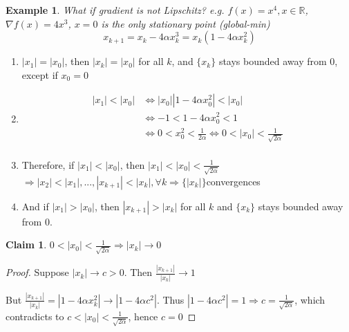 \documentclass[11pt,a4paper]{article}
\newtheorem{example}{Example}
\newtheorem{claim}{Claim}
\begin{document}
\begin{example}
What if gradient is not Lipschitz? e.g. $f(x)=x^4,x\in \mathbb{R}$, $\nabla f(x)=4x^3$, $x=0$ is the only stationary point (global-min)
$$x_{k+1}=x_k-4\alpha x_k^3=x_k(1-4\alpha x_k^2)$$
\end{example}
\begin{enumerate}[$\bullet$]
    \item $|x_1|=|x_0|$, then $|x_k|=|x_0|$ for all $k$, and $\{x_k\}$ stays bounded away from $0$, except if $x_0=0$
    \item \begin{equation}
        \begin{aligned}
            |x_1|<|x_0| &\Leftrightarrow	|x_0||1-4\alpha x_0^2|<|x_0|\\
            &\Leftrightarrow -1<1-4\alpha x_0^2<1\\
            &\Leftrightarrow 0<x_0^2<\frac{1}{2\alpha} \Leftrightarrow	0<|x_0|<\frac{1}{\sqrt{2\alpha}}\\
        \end{aligned}
        \nonumber
    \end{equation}
    \item Therefore, if $|x_1|<|x_0|$, then $|x_1|<|x_0|<\frac{1}{\sqrt{2\alpha}}$ $\Rightarrow	|x_2|<|x_1|,...,|x_{k+1}|<|x_k|,\forall k \Rightarrow \{|x_k|\}$convergences
    \item And if $|x_1|>|x_0|$, then $|x_{k+1}|>|x_k|$ for all $k$ and $\{x_k\}$ stays bounded away from $0$.
\end{enumerate}
\begin{claim}
$0<|x_0|<\frac{1}{\sqrt{2\alpha}} \Rightarrow |x_k| \rightarrow	0$
\end{claim}
\begin{proof}
Suppose $|x_k| \rightarrow	c>0$. Then $\frac{|x_{k+1}|}{|x_k|} \rightarrow	1$

But $\frac{|x_{k+1}|}{|x_k|} = |1-4\alpha x_k^2| \rightarrow |1-4\alpha c^2|$. Thus $|1-4\alpha c^2|=1 \Rightarrow	c=\frac{1}{\sqrt{2\alpha}}$, which contradicts to $c<|x_0|<\frac{1}{\sqrt{2\alpha}}$, hence $c=0$

\end{proof}
\end{document}
